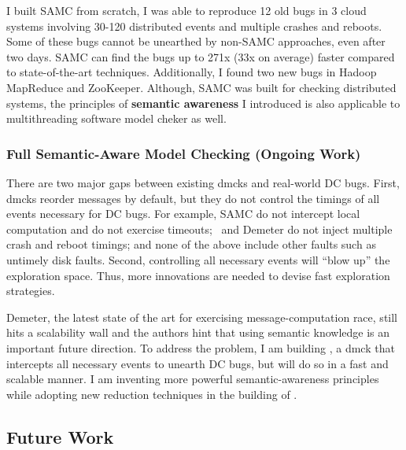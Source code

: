 \documentclass[11pt]{article}
\begin{document}
I built SAMC from scratch, I was able to reproduce 12 old bugs
in 3 cloud systems involving 30-120 distributed events and multiple crashes and
reboots. Some of these bugs cannot be unearthed by non-SAMC approaches, even
after two days. SAMC can find the bugs up to 271x (33x on average) faster
compared to state-of-the-art techniques. Additionally, I found two new bugs in
Hadoop MapReduce and ZooKeeper. Although, SAMC was built for checking
distributed systems, the principles of \textbf{semantic awareness} I
introduced is also applicable to multithreading software model cheker as well.

\subsubsection*{Full Semantic-Aware Model Checking (Ongoing Work)} 

There are two major gaps between existing dmcks and real-world
DC bugs. First, dmcks reorder messages by default, but they do not control the
timings of all events necessary for DC bugs. For example, 
SAMC do not intercept local computation and do not exercise timeouts;
\modist\ and Demeter do not inject multiple crash and reboot timings; and none
of the above include other faults such as untimely disk faults.
%
Second, controlling all necessary events will ``blow up'' the exploration space.
Thus, more innovations are needed to devise fast exploration strategies.


Demeter, the latest state of the art for exercising message-computation race,
still hits a scalability wall and the authors hint that using semantic knowledge
is an important future direction. To address the problem, I am building
\fullcheck, a dmck that intercepts all necessary events to unearth DC bugs, but
will do so in a fast and scalable manner. I am inventing more powerful
semantic-awareness principles while adopting new reduction techniques in the
building of \fullcheck.



\subsection{Future Work}
\end{document}
